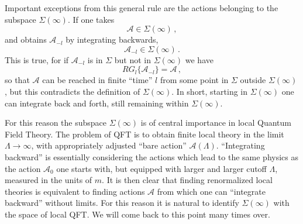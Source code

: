 Important exceptions from this general rule are the actions belonging to the
subspace $\Sigma(\infty)$. If one takes
\[
\mathcal A\in\Sigma(\infty)\,,
\]
and obtains $\mathcal A_{-l}$ by integrating backwards,
\[
\mathcal A_{-l}\in\Sigma(\infty)\,.
\]
This is true, for if $\mathcal A_{-l}$ is in $\Sigma$ but not in
$\Sigma(\infty)$ we have
\[
RG_l\{\mathcal A_{-l}\}=\mathcal A\,,
\]
so that $\mathcal A$ can be reached in finite ``time'' $l$ from some point in
$\Sigma$ outside $\Sigma(\infty)$, but this contradicts the definition of
$\Sigma(\infty)$. In short, starting in $\Sigma(\infty)$ one can integrate back
and forth, still remaining within $\Sigma(\infty)$.

For this reason the subspace $\Sigma(\infty)$ is of central importance in local
Quantum Field Theory. The problem of QFT is to obtain finite local theory in the
limit $\Lambda\to\infty$, with appropriately adjusted ``bare action''
$\mathcal A(\Lambda)$. ``Integrating backward'' is essentially considering the
actions which lead to the same physics as the action $\mathcal A_0$ one starts
with, but equipped with larger and larger cutoff $\Lambda$, measured in the units
of $m$. It is then clear that finding renormalized local theories is equivalent
to finding actions $\mathcal A$ from which one can ``integrate backward'' without
limits. For this reason it is natural to identify $\Sigma(\infty)$ with the space
of local QFT. We will come back to this point many times over.
